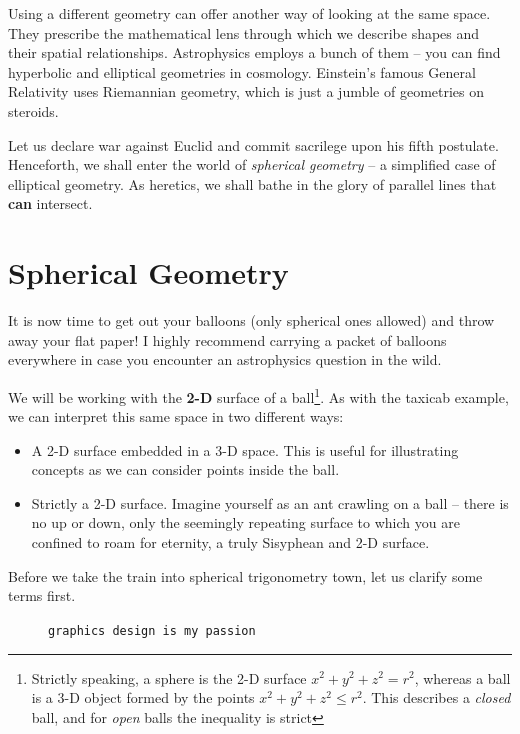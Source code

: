 \documentclass{article}
\begin{document}
Using a different geometry can offer another way of looking at the same space. They prescribe the mathematical lens through which we describe shapes and their spatial relationships. Astrophysics employs a bunch of them -- you can find hyperbolic and elliptical geometries in cosmology. Einstein's famous General Relativity uses Riemannian geometry, which is just a jumble of geometries on steroids.

Let us declare war against Euclid and commit sacrilege upon his fifth postulate. Henceforth, we shall enter the world of \textit{spherical geometry} -- a simplified case of elliptical geometry. As heretics, we shall bathe in the glory of parallel lines that \textbf{can} intersect.

\section{Spherical Geometry}
It is now time to get out your balloons (only spherical ones allowed) and throw away your flat paper! I highly recommend carrying a packet of balloons everywhere in case you encounter an astrophysics question in the wild.

We will be working with the \textbf{2-D} surface of a ball\footnote{Strictly speaking, a sphere is the 2-D surface $x^2+y^2+z^2=r^2$, whereas a ball is a 3-D object formed by the points $x^2+y^2+z^2 \leq r^2$. This describes a \textit{closed} ball, and for \textit{open} balls the inequality is strict}. As with the taxicab example, we can interpret this same space in two different ways:
\begin{itemize}
    \item A 2-D surface embedded in a 3-D space. This is useful for illustrating concepts as we can consider points inside the ball.
    \item Strictly a 2-D surface. Imagine yourself as an ant crawling on a ball -- there is no up or down, only the seemingly repeating surface to which you are confined to roam for eternity, a truly Sisyphean and 2-D surface.
\end{itemize}

Before we take the train into spherical trigonometry town, let us clarify some terms first.

\begin{figure}[h]
    \centering
    \caption{\texttt{graphics design is my passion}}
    \label{fig:great_circle}
\end{figure}
\end{document}
